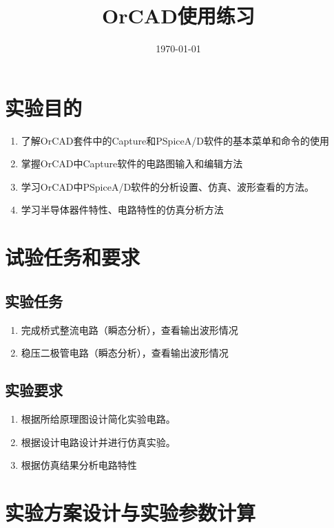 \documentclass{../source/Experiment}
\title{OrCAD使用练习}
\date{\today}
\begin{document}
    \makecover
    \makeheader

    \section{实验目的}
        \begin{enumerate}
            \item 了解OrCAD套件中的Capture和PSpiceA/D软件的基本菜单和命令的使用
            \item 掌握OrCAD中Capture软件的电路图输入和编辑方法
            \item 学习OrCAD中PSpiceA/D软件的分析设置、仿真、波形查看的方法。
            \item 学习半导体器件特性、电路特性的仿真分析方法
        \end{enumerate}
    
    \section{试验任务和要求}
        \subsection{实验任务}
            \begin{enumerate}
                \item 完成桥式整流电路（瞬态分析），查看输出波形情况
                \item 稳压二极管电路（瞬态分析），查看输出波形情况
            \end{enumerate}
        \subsection{实验要求}
            \begin{enumerate}
                \item 根据所给原理图设计简化实验电路。
                \item 根据设计电路设计并进行仿真实验。
                \item 根据仿真结果分析电路特性
            \end{enumerate}
            
    \section{实验方案设计与实验参数计算}
\end{document}
